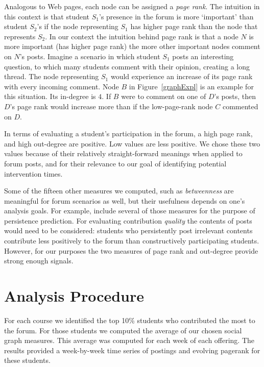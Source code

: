 Analogous to Web pages, each node can be assigned a {\em page
  rank}. The intuition in this context is that student $S_1$'s
presence in the forum is more `important' than student $S_2$'s if the
node representing $S_1$ has higher page rank than the node that
represents $S_2$. In our context the intuition behind page rank is
that a node $N$ is more important (has higher page rank) the more
other important nodes comment on $N$'s posts. Imagine a scenario
in which student $S_1$ posts an interesting question, to which many
students comment with their opinion, creating a long thread. The node
representing $S_1$ would experience an increase of its page rank with
every incoming comment. Node $B$ in Figure~\ref{graphExpl} is an
example for this situation. Its in-degree is $4$. If $B$ were to
comment on one of $D$'s posts, then $D$'s page rank would increase
more than if the low-page-rank node $C$ commented on $D$.

In terms of evaluating a student's participation in the forum, a high
page rank, and high out-degree are positive. Low values are less
positive. We chose these two values because of their relatively
straight-forward meanings when applied to forum posts, and for their
relevance to our goal of identifying potential intervention times.

Some of the fifteen other measures we computed, such as {\em
  betweenness} are meaningful for forum scenarios as well, but their
usefulness depends on one's analysis goals. For example,
\cite{yang2013} include several of those measures for the purpose of
persistence prediction. For evaluating contribution {\em quality} the
contents of posts would need to be considered: students who
persistently post irrelevant contents contribute less positively to
the forum than constructively participating students. However, for our
purposes the two measures of page rank and out-degree provide strong
enough signals.

\section{Analysis Procedure}

For each course we identified the top 10\% students who contributed
the most to the forum. For those students we computed the average of
our chosen social graph measures. This average was computed for each
week of each offering. The results provided a week-by-week time series
of postings and evolving pagerank for these students.

